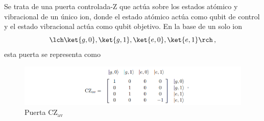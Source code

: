 Se trata de una puerta controlada-Z que actúa sobre los estados atómico y vibracional de un único ion, donde el estado atómico actúa como qubit de control y el estado vibracional actúa como qubit objetivo. En la base de un solo ion
	\begin{equation}
 	\lch \ket{g,0}, \ket{g,1}, \ket{e,0}, \ket{e,1} \rch\, ,
 	\end{equation}
esta puerta se representa como
\begin{figure}[h]
    \centering 
    \includegraphics[width=1\linewidth]{Figuras/Fig_ions_CZav_matrix.png}
    \caption{Puerta CZ${}_\text{av}$}
    \label{Fig_ions_CZav_matrix}
\end{figure}



